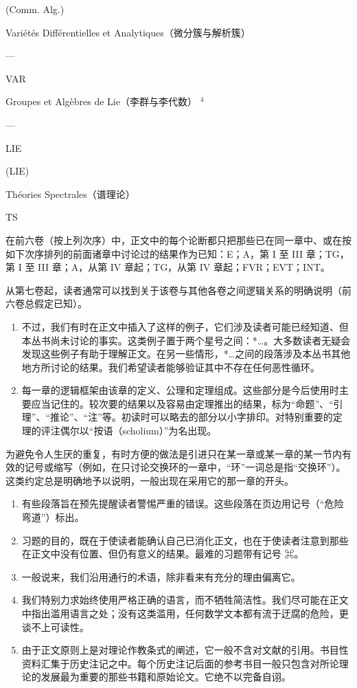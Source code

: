 (Comm. Alg.)

Variétés Différentielles et Analytiques（微分簇与解析簇）

---

VAR

Groupes et Algèbres de Lie（李群与李代数） \(^{4}\)

---

LIE

(LIE)

Théories Spectrales（谱理论）

TS

在前六卷（按上列次序）中，正文中的每个论断都只把那些已在同一章中、或在按如下次序排列的前面诸章中讨论过的结果作为已知：E；A，第 I 至 III 章；TG，第 I 至 III 章；A，从第 IV 章起；TG，从第 IV 章起；FVR；EVT；INT。

从第七卷起，读者通常可以找到关于该卷与其他各卷之间逻辑关系的明确说明（前六卷总假定已知）。

\begin{enumerate}
\def\labelenumi{\arabic{enumi}.}
\setcounter{enumi}{3}
\item
  不过，我们有时在正文中插入了这样的例子，它们涉及读者可能已经知道、但本丛书尚未讨论的事实。这类例子置于两个星号之间：*\ldots*。大多数读者无疑会发现这些例子有助于理解正文。在另一些情形，*\ldots* 之间的段落涉及本丛书其他地方所讨论的结果。我们希望读者能够验证其中不存在任何恶性循环。
\item
  每一章的逻辑框架由该章的定义、公理和定理组成。这些部分是今后使用时主要应当记住的。较次要的结果以及容易由定理推出的结果，标为“命题”、“引理”、“推论”、“注”等。初读时可以略去的部分以小字排印。对特别重要的定理的评注偶尔以“按语（scholium）”为名出现。
\end{enumerate}

为避免令人生厌的重复，有时方便的做法是引进只在某一章或某一章的某一节内有效的记号或缩写（例如，在只讨论交换环的一章中，“环”一词总是指“交换环”）。这类约定总是明确地予以说明，一般出现在采用它的那一章的开头。

\begin{enumerate}
\def\labelenumi{\arabic{enumi}.}
\setcounter{enumi}{5}
\item
  有些段落旨在预先提醒读者警惕严重的错误。这些段落在页边用记号（“危险弯道”）标出。
\item
  习题的目的，既在于使读者能确认自己已消化正文，也在于使读者注意到那些在正文中没有位置、但仍有意义的结果。最难的习题带有记号 ⌘。
\item
  一般说来，我们沿用通行的术语，除非看来有充分的理由偏离它。
\item
  我们特别力求始终使用严格正确的语言，而不牺牲简洁性。我们尽可能在正文中指出滥用语言之处；没有这类滥用，任何数学文本都有流于迂腐的危险，更谈不上可读性。
\item
  由于正文原则上是对理论作教条式的阐述，它一般不含对文献的引用。书目性资料汇集于历史注记之中。每个历史注记后面的参考书目一般只包含对所论理论的发展最为重要的那些书籍和原始论文。它绝不以完备自诩。
\end{enumerate}

